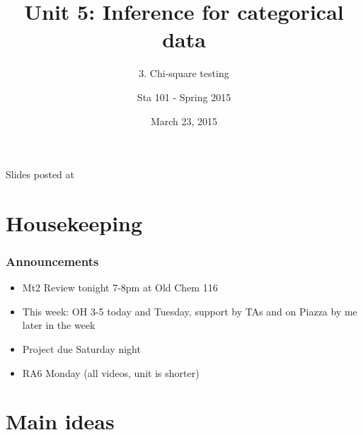 \documentclass[11pt,containsverbatim,handout,xcolor=xelatex,dvipsnames,table]{beamer}
\title{Unit 5: Inference for categorical data}
\subtitle{3. Chi-square testing}
\author{Sta 101 - Spring 2015}
\date{March 23, 2015}
\institute{Duke University, Department of Statistical Science}
\begin{document}


\begin{frame}[plain]

\titlepage
\vfill
{\scriptsize {} \hfill Slides posted at  \webLink{\CourseSite}{\CourseSite}}
\addtocounter{framenumber}{-1} 

\end{frame}


\section{Housekeeping}


\begin{frame}
\frametitle{Announcements}

\begin{itemize}

\item Mt2 Review tonight 7-8pm at Old Chem 116

\item This week: OH 3-5 today and Tuesday, support by TAs and on Piazza by me later in the week

\item Project due Saturday night

\item RA6 Monday (all videos, unit is shorter)





\end{itemize}

\end{frame}


\section{Main ideas}
\end{document}
